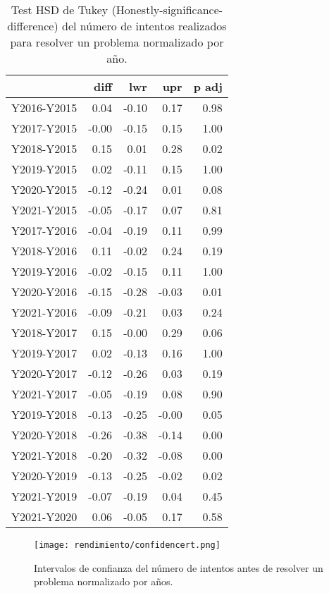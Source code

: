 \begin{table}[H]
\centering
\caption{Test HSD de Tukey (Honestly-significance-difference) del número de intentos realizados para resolver un problema normalizado por año.}
\label{tab:Tukeysessionsbefore}
\begin{tabular}{rrrrr}
  \hline
 & diff & lwr & upr & p adj \\ 
  \hline
Y2016-Y2015 & 0.04 & -0.10 & 0.17 & 0.98 \\ 
  Y2017-Y2015 & -0.00 & -0.15 & 0.15 & 1.00 \\ 
  Y2018-Y2015 & 0.15 & 0.01 & 0.28 & 0.02 \\ 
  Y2019-Y2015 & 0.02 & -0.11 & 0.15 & 1.00 \\ 
  Y2020-Y2015 & -0.12 & -0.24 & 0.01 & 0.08 \\ 
  Y2021-Y2015 & -0.05 & -0.17 & 0.07 & 0.81 \\ 
  Y2017-Y2016 & -0.04 & -0.19 & 0.11 & 0.99 \\ 
  Y2018-Y2016 & 0.11 & -0.02 & 0.24 & 0.19 \\ 
  Y2019-Y2016 & -0.02 & -0.15 & 0.11 & 1.00 \\ 
  Y2020-Y2016 & -0.15 & -0.28 & -0.03 & 0.01 \\ 
  Y2021-Y2016 & -0.09 & -0.21 & 0.03 & 0.24 \\ 
  Y2018-Y2017 & 0.15 & -0.00 & 0.29 & 0.06 \\ 
  Y2019-Y2017 & 0.02 & -0.13 & 0.16 & 1.00 \\ 
  Y2020-Y2017 & -0.12 & -0.26 & 0.03 & 0.19 \\ 
  Y2021-Y2017 & -0.05 & -0.19 & 0.08 & 0.90 \\ 
  Y2019-Y2018 & -0.13 & -0.25 & -0.00 & 0.05 \\ 
  Y2020-Y2018 & -0.26 & -0.38 & -0.14 & 0.00 \\ 
  Y2021-Y2018 & -0.20 & -0.32 & -0.08 & 0.00 \\ 
  Y2020-Y2019 & -0.13 & -0.25 & -0.02 & 0.02 \\ 
  Y2021-Y2019 & -0.07 & -0.19 & 0.04 & 0.45 \\ 
  Y2021-Y2020 & 0.06 & -0.05 & 0.17 & 0.58 \\ 
   \hline
\end{tabular}
\end{table}

\begin{figure}[H]
    \centering
    \texttt{[image: rendimiento/confidencert.png]}
    \caption{Intervalos de confianza del número de intentos antes de resolver un problema normalizado por años.}
    \label{fig:confidencesessionsbefore}
\end{figure}

